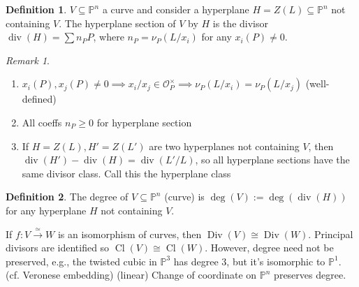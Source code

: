 \documentclass{article}
\theoremstyle{definition}
\newtheorem{defn}{Definition}[section]
\theoremstyle{remark}
\newtheorem{rem}{Remark}
\theoremstyle{plain}
\newcommand{\PP}{\mathbb{P}}
\newcommand{\cl}{\operatorname{Cl}}
\begin{document}
\begin{defn}
    $V\subseteq\PP^n$ a curve  and consider a hyperplane $H=Z(L)\subseteq\PP^n$ not containing $V$. The hyperplane section of $V$ by $H$ is the divisor $\operatorname{div}(H)=\sum n_PP$, where $n_P=\nu_P(L/x_i)$ for any $x_i(P)\neq 0$.
\end{defn}
\begin{rem}\
    \begin{enumerate}
        \item $x_i(P),x_j(P)\neq 0\implies x_i/x_j\in\mathcal O_P^\times\implies \nu_P(L/x_i)=\nu_P(L/x_j)$ (well-defined)
        \item All coeffs $n_P\ge 0$ for hyperplane section
        \item If $H=Z(L),H'=Z(L')$ are two hyperplanes not containing $V$, then $\operatorname{div}(H')-\operatorname{div}(H)=\operatorname{div}(L'/L)$, so all hyperplane sections have the same divisor class. Call this the hyperplane class
    \end{enumerate}
\end{rem}
\begin{defn}
    The degree of $V\subseteq\PP^n$ (curve) is $\deg(V):=\deg(\operatorname{div}(H))$ for any hyperplane $H$ not containing $V$. 
\end{defn}
If $f:V\overset{\simeq}{\to} W$ is an isomorphism of curves, then $\operatorname{Div}(V)\cong\operatorname{Div}(W)$. Principal divisors are identified so $\cl(V)\cong\cl(W)$. However, degree need not be preserved, e.g., the twisted cubic in $\PP^3$ has degree $3$, but it's isomorphic to $\PP^1$. (cf. Veronese embedding)
(linear) Change of coordinate on $\PP^n$ preserves degree.
\end{document}

